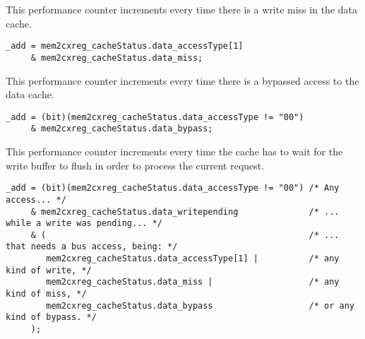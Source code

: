 
This performance counter increments every time there is a write miss in the data 
cache.

\implementation{}
\begin{lstlisting}
_add = mem2cxreg_cacheStatus.data_accessType[1]
     & mem2cxreg_cacheStatus.data_miss;
\end{lstlisting}


This performance counter increments every time there is a bypassed access to the 
data cache.

\implementation{}
\begin{lstlisting}
_add = (bit)(mem2cxreg_cacheStatus.data_accessType != "00")
     & mem2cxreg_cacheStatus.data_bypass;
\end{lstlisting}


This performance counter increments every time the cache has to wait for the
write buffer to flush in order to process the current request.

\implementation{}
\begin{lstlisting}
_add = (bit)(mem2cxreg_cacheStatus.data_accessType != "00") /* Any access... */
     & mem2cxreg_cacheStatus.data_writepending              /* ... while a write was pending... */
     & (                                                    /* ... that needs a bus access, being: */
        mem2cxreg_cacheStatus.data_accessType[1] |          /* any kind of write, */
        mem2cxreg_cacheStatus.data_miss |                   /* any kind of miss, */
        mem2cxreg_cacheStatus.data_bypass                   /* or any kind of bypass. */
     );
\end{lstlisting}
